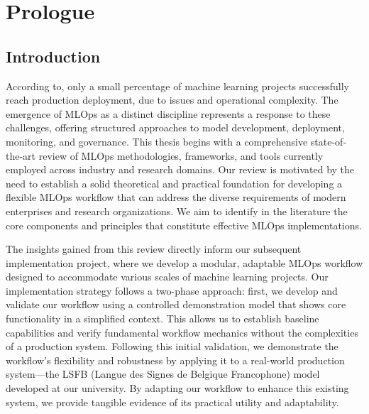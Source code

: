 \chapter{Prologue} %

\section{Introduction}

According to\cite{10.1145/3533378}, only a small percentage of machine learning projects successfully reach production deployment, due to issues and operational complexity\cite{Haakman2021}.
The emergence of MLOps as a distinct discipline represents a response to these challenges, offering structured approaches to model development, deployment, monitoring, and governance\cite{treveil2020introducing}.
This thesis begins with a comprehensive state-of-the-art review of MLOps methodologies, frameworks, and tools currently employed across industry and research domains.
Our review is motivated by the need to establish a solid theoretical and practical foundation for developing a flexible MLOps workflow that can address the diverse requirements of modern enterprises and research organizations.
We aim to identify in the literature the core components and principles that constitute effective MLOps implementations\cite{DBLP:journals/corr/abs-2103-08942}.

The insights gained from this review directly inform our subsequent implementation project, where we develop a modular, adaptable MLOps workflow designed to accommodate various scales of machine learning projects.
Our implementation strategy follows a two-phase approach: first, we develop and validate our workflow using a controlled demonstration model that shows core functionality in a simplified context.
This allows us to establish baseline capabilities and verify fundamental workflow mechanics without the complexities of a production system.
Following this initial validation, we demonstrate the workflow's flexibility and robustness by applying it to a real-world production system—the LSFB (Langue des Signes de Belgique Francophone) model developed at our university\cite{9534336}.
By adapting our workflow to enhance this existing system, we provide tangible evidence of its practical utility and adaptability.


